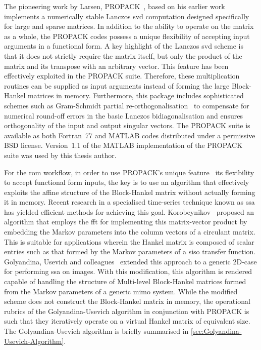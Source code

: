 The  pioneering  work  by  Larsen, PROPACK~\cite{LarsenPropack},  based  on  his
earlier work~\cite{Larsen1998} implements a numerically stable Lanczos \gls{svd}
computation designed specifically for large  and sparse matrices. In addition to
the ability  to operate on the  matrix as a  whole, the PROPACK codes  possess a
unique flexibility  of accepting  input arguments  in a  functional form.  A key
highlight of the  Lanczos \gls{svd} scheme is that it  does not strictly require
the  matrix  itself, but  only  the  product of  the  matrix  and its  transpose
with  an  arbitrary vector.  This  feature  has  been effectively  exploited  in
the  PROPACK suite.  Therefore, these  multiplication routines  can be  supplied
as  input  arguments instead  of  forming  the  large Block-Hankel  matrices  in
memory.  Furthermore,  this  package  includes  sophisticated  schemes  such  as
Gram-Schmidt  partial re-orthogonalisation~\cite{Bjorck1994}  to compensate  for
numerical round-off  errors in the  basic Lanczos bidiagonalisation  and ensures
orthogonality of  the input and  output singular  vectors. The PROPACK  suite is
available as both Fortran~77 and MATLAB codes distributed under a permissive BSD
license. Version~1.1 of the MATLAB implementation  of the PROPACK suite was used
by this thesis author.

For the \gls{rom} workflow, in order  to use PROPACK's unique feature \viz~its
flexibility to  accept functional form  inputs, the key  is to use  an algorithm
that  effectively  exploits the  affine  structure  of the  Block-Hankel  matrix
without  actually  forming  it  in  memory. Recent  research  in  a  specialised
time-series technique known as \gls{ssa}~\cite{Elsner1996} has yielded efficient
methods for  achieving this goal.  Korobeynikov~\cite{Korobeynikov2010} proposed
an  algorithm that  employs the  \gls{fft} for  implementing this  matrix-vector
product  by  embedding the  Markov  parameters  into  the  column vectors  of  a
circulant  matrix.  This  is  suitable   for  applications  wherein  the  Hankel
matrix  is  composed  of scalar  entries  such  as  that  formed by  the  Markov
parameters  of   a  \gls{siso}   transfer  function.  Golyandina,   Usevich  and
colleagues~\cite{Golyandina2010,Golyandina2015}  extended  this  approach  to  a
generic  2D-case for  performing \gls{ssa}  on images.  With this  modification,
this  algorithm is  rendered capable  of handling  the structure  of Multi-level
Block-Hankel matrices formed from the  Markov parameters of a generic \gls{mimo}
system. While  the modified  scheme does not  construct the  Block-Hankel matrix
in  memory,  the operational  rubrics  of  the Golyandina-Usevich  algorithm  in
conjunction with  PROPACK is  such that  they iteratively  operate on  a virtual
Hankel matrix  of equivalent size.  The Golyandina-Usevich algorithm  is briefly
summarised in \cref{sec:Golyandina-Usevich-Algorithm}.

